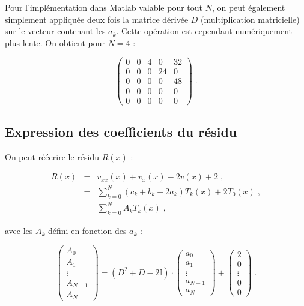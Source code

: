 \documentclass{report}
\begin{document}
Pour l'implémentation dans Matlab valable pour tout $N$, on peut également simplement appliquée deux fois la matrice dérivée $D$ (multiplication matricielle) sur le vecteur contenant les $a_{k}$. Cette opération est cependant numériquement plus lente. On obtient pour $N=4$ :

\begin{equation}
\begin{pmatrix}
0 & 0 & 4 & 0 & 32\\ 
0 & 0 & 0 & 24 & 0\\ 
0 & 0 & 0 & 0 & 48\\ 
0 & 0 & 0 & 0 & 0\\ 
0 & 0 & 0 & 0 & 0
\end{pmatrix} \;.
\end{equation}

\subsection*{Expression des coefficients du résidu}

On peut réécrire le résidu $R(x)$ :

\begin{eqnarray}
R(x) & = & v_{xx}(x) + v_x(x) - 2v(x) + 2\;,  \\
& = & \sum_{k=0}^N \left(c_{k}+b_{k}-2a_{k}\right)T_{k}(x)+2 T_{0}(x)\;, \\
& = & \sum_{k=0}^N A_{k} T_{k}(x)\;, 
\end{eqnarray}

avec les $A_{k}$ défini en fonction des $a_{k}$ :

\begin{equation}
\begin{pmatrix}
 A_{0}\\ 
 A_{1}\\ 
 \vdots\\ 
 A_{N-1}\\ 
 A_{N}
\end{pmatrix} 
= \left(D^{2} + D - 2 \mathbb{I}\right) \cdot \begin{pmatrix}
 a_0\\ 
 a_1\\ 
 \vdots\\ 
 a_{N-1}\\ 
 a_{N}
\end{pmatrix}
+ \begin{pmatrix}
 2\\ 
 0\\ 
 \vdots\\ 
 0\\ 
 0
\end{pmatrix}\;.\label{Ak}
\end{equation}
\end{document}
